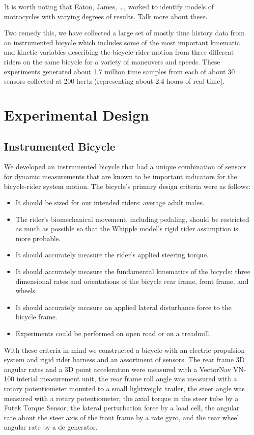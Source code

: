 \documentclass{article}
\begin{document}
It is worth noting that Eaton, James, \ldots, worked to identify models of
motrocycles with varying degrees of results. Talk more about these.

Two remedy this, we have collected a large set of mostly time history data from
an instrumented bicycle which includes some of the most important kinematic and
kinetic variables describing the bicycle-rider motion from three different
riders on the same bicycle for a variety of maneuvers and speeds. These
experiments generated about 1.7 million time samples from each of about 30
sensors collected at 200 hertz (representing about 2.4 hours of real time).

\section{Experimental Design}

\subsection{Instrumented Bicycle}
We developed an instrumented bicycle that had a unique combination of sensors
for dynamic measurements that are known to be important indicators for the
bicycle-rider system motion. The bicycle's primary design criteria were as
follows:

\begin{itemize}
  \item It should be sized for our intended riders: average adult males.
  \item The rider's biomechanical movement, including pedaling, should be
    restricted as much as possible so that the Whipple model's rigid rider
    assumption is more probable.
  \item It should accurately measure the rider's applied steering torque.
  \item It should accurately measure the fundamental kinematics of the bicycle:
    three dimensional rates and orientations of the bicycle rear frame, front
    frame, and wheels.
  \item It should accurately measure an applied lateral disturbance force to
    the bicycle frame.
  \item Experiments could be performed on open road or on a treadmill.
\end{itemize}

With these criteria in mind we constructed a bicycle with an electric
propulsion system and rigid rider harness and an assortment of sensors. The
rear frame 3D angular rates and a 3D point acceleration were measured with a
VectorNav VN-100 interial measurement unit, the rear frame roll angle was
measured with a rotary potentiometer mounted to a small lightweight trailer,
the steer angle was measured with a rotary potentiometer, the axial torque in
the steer tube by a Futek Torque Sensor, the lateral perturbation force by a
load cell, the angular rate about the steer axis of the front frame by a rate
gyro, and the rear wheel angular rate by a dc generator.
\end{document}
